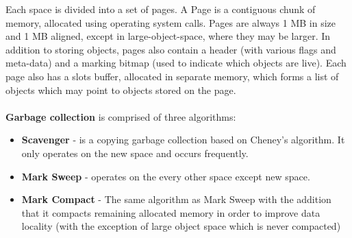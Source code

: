 \documentclass{l4proj}
\begin{document}
Each space is divided into a set of pages. A Page is a contiguous chunk of memory, allocated using operating system calls. Pages are always 1 MB in size and 1 MB aligned, except in large-object-space, where they may be larger. In addition to storing objects, pages also contain a header (with various flags and meta-data) and a marking bitmap (used to indicate which objects are live). Each page also has a slots buffer, allocated in separate memory, which forms a list of objects which may point to objects stored on the page.\cite{v8gctour}
\\\\
\textbf{Garbage collection} is comprised of three algorithms:
\begin{itemize}
\item \textbf{Scavenger} - is a copying garbage collection based on Cheney's algorithm. It only operates on the new space and occurs frequently.
\item \textbf{Mark Sweep} - operates on the every other space except new space.
\item \textbf{Mark Compact} - The same algorithm as Mark Sweep with the addition that it compacts remaining allocated memory in order to improve data locality (with the exception of large object space which is never compacted)
\end{itemize}
\end{document}
